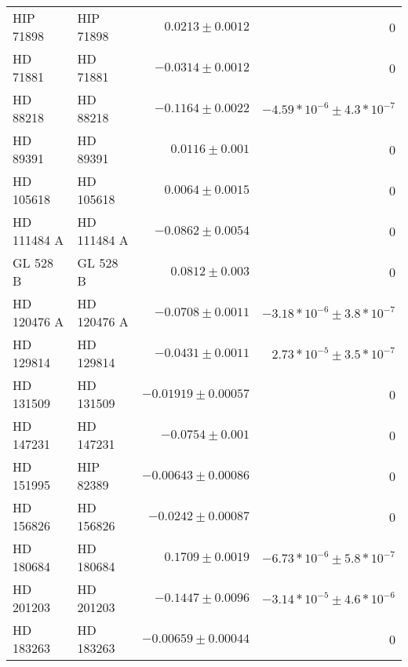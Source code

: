 \begin{longtable*}{llrr}
HIP 71898 & HIP 71898 & $0.0213\pm 0.0012$ & 0 \\
HD 71881 & HD 71881 & $-0.0314\pm 0.0012$ & 0 \\
HD 88218 & HD 88218 & $-0.1164\pm 0.0022$ & $-4.59*10^{-6}\pm 4.3*10^{-7}$ \\
HD 89391 & HD 89391 & $0.0116\pm 0.001$ & 0 \\
HD 105618 & HD 105618 & $0.0064\pm 0.0015$ & 0 \\
HD 111484 A & HD 111484 A & $-0.0862\pm 0.0054$ & 0 \\
GL 528 B & GL 528 B & $0.0812\pm 0.003$ & 0 \\
HD 120476 A & HD 120476 A & $-0.0708\pm 0.0011$ & $-3.18*10^{-6}\pm 3.8*10^{-7}$ \\
HD 129814 & HD 129814 & $-0.0431\pm 0.0011$ & $2.73*10^{-5}\pm 3.5*10^{-7}$ \\
HD 131509 & HD 131509 & $-0.01919\pm 0.00057$ & 0 \\
HD 147231 & HD 147231 & $-0.0754\pm 0.001$ & 0 \\
HD 151995 & HIP 82389 & $-0.00643\pm 0.00086$ & 0 \\
HD 156826 & HD 156826 & $-0.0242\pm 0.00087$ & 0 \\
HD 180684 & HD 180684 & $0.1709\pm 0.0019$ & $-6.73*10^{-6}\pm 5.8*10^{-7}$ \\
HD 201203 & HD 201203 & $-0.1447\pm 0.0096$ & $-3.14*10^{-5}\pm 4.6*10^{-6}$ \\
HD 183263 & HD 183263 & $-0.00659\pm 0.00044$ & 0 \\
\bottomrule
\end{longtable*}
